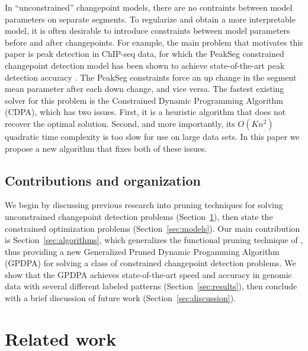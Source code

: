 \documentclass{article}
\begin{document}
In ``unconstrained'' changepoint models, there are no contraints
between model parameters on separate segments. To regularize and obtain a more
interpretable model, it is often desirable to introduce constraints
between model parameters before and after changepoints. 
For example, the main problem that motivates this paper is peak detection in
ChIP-seq data, for which the \mbox{PeakSeg} constrained changepoint
detection model has been shown to achieve state-of-the-art peak
detection accuracy \citep{HOCKING-PeakSeg}. The \mbox{PeakSeg}
constraints force an up change in the segment mean parameter after
each down change, and vice versa.
The fastest existing solver for this problem is the Constrained
Dynamic Programming Algorithm (CDPA), which has two issues. First, it
is a heuristic algorithm that does not recover the optimal
solution. Second, and more importantly, its $O(Kn^2)$ quadratic time
complexity is too slow for use on large data sets.  In this paper we
propose a new algorithm that fixes both of these issues.

\subsection{Contributions and organization}

We begin by discussing previous research into pruning techniques for
solving unconstrained changepoint detection problems
(Section~\ref{sec:related}), then state the constrained optimization
problems (Section~\ref{sec:models}). Our main contribution is
Section~\ref{sec:algorithms}, which generalizes the functional pruning
technique of \citet{pruned-dp}, thus providing a new Generalized
Pruned Dynamic Progamming Algorithm (GPDPA) for solving a class of
constrained changepoint detection problems. We show that the GPDPA
achieves state-of-the-art speed and accuracy in genomic data with
several different labeled patterns (Section~\ref{sec:results}), then
conclude with a brief discussion of future work
(Section~\ref{sec:discussion}).

\section{Related work}
\label{sec:related}
\end{document}
